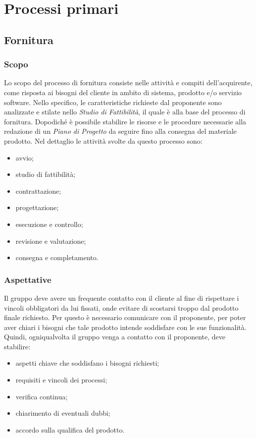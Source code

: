 \section{Processi primari}
	\subsection{Fornitura}
		\subsubsection{Scopo}
		Lo scopo del processo di fornitura consiste nelle attività e compiti dell'acquirente, come risposta ai bisogni del cliente in ambito di sistema, prodotto e/o servizio software. Nello specifico, le caratteristiche richieste dal proponente sono analizzate e stilate nello \textit{Studio di Fattibilità}, il quale è alla base del processo di fornitura. Dopodiché è possibile stabilire le risorse e le procedure necessarie alla redazione di un \textit{Piano di Progetto} da seguire fino alla consegna del materiale prodotto.
		Nel dettaglio le attività svolte da questo processo sono:
		\begin{itemize}
			\item avvio;
			\item studio di fattibilità;
			\item contrattazione;
			\item progettazione;
			\item esecuzione e controllo;
			\item revisione e valutazione;
			\item consegna e completamento.
		\end{itemize}
		\subsubsection{Aspettative}
		Il gruppo deve avere un frequente contatto con il cliente al fine di rispettare i vincoli obbligatori da lui fissati, onde evitare di scostarsi troppo dal prodotto finale richiesto. Per questo è necessario comunicare con il proponente, per poter aver chiari i bisogni che tale prodotto intende soddisfare con le sue funzionalità. Quindi, ogniqualvolta il gruppo venga a contatto con il proponente, deve stabilire:
		\begin{itemize}
			\item aspetti chiave che soddisfano i bisogni richiesti;
			\item requisiti e vincoli dei processi;
			\item verifica continua;
			\item chiarimento di eventuali dubbi;
			\item accordo sulla qualifica del prodotto.
			\end{itemize} 

